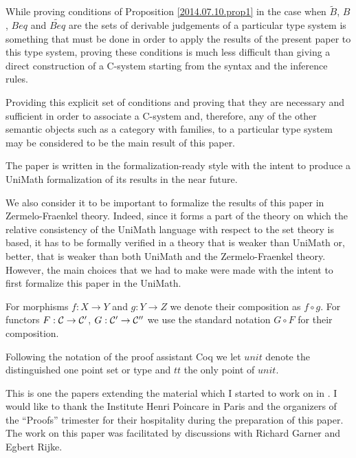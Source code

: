\documentclass[11pt]{article}
\newcommand{\sr}{\rightarrow}
\newcommand{\wt}{\widetilde}
\newcommand{\wh}{\widehat}
\begin{document}
While proving conditions of Proposition \ref{2014.07.10.prop1} in the case when ${\wt{B}}$, ${B}$, ${Beq}$ and ${\wt{Beq}}$ are the sets of derivable judgements of a particular type system is something that must be done in order to apply the results of the present paper to this type system, proving these conditions is much less difficult than giving a direct construction of a C-system starting from the syntax and the inference rules.

Providing this explicit set of conditions and proving that they are necessary and sufficient in order to associate a C-system and, therefore, any of the other semantic objects such as a category with families, to a particular type system may be considered to be the main result of this paper. 

\vspace{5mm}

The paper is written in the formalization-ready style with the intent to produce a UniMath formalization of its results in the near future. 

We also consider it to be important to formalize the results of this paper in Zermelo-Fraenkel theory. Indeed, since it forms a part of the theory on which the relative consistency of the UniMath language with respect to the set theory is based, it has to be formally verified in a theory that is weaker than UniMath or, better, that is weaker than both UniMath and the Zermelo-Fraenkel theory. However, the main choices that we had to make were made with the intent to first formalize this paper in the UniMath.

\vspace{5mm}

For morphisms $f:X\sr Y$ and $g:Y\sr Z$ we denote their composition as $f\circ g$. For functors $F:{\cal C}\sr {\cal C}'$, $G:{\cal C}'\sr {\cal C}''$ we use the standard notation $G\circ F$ for their composition. 

Following the notation of the proof assistant Coq we let $unit$ denote the distinguished one point set or type and $tt$ the only point of $unit$. 

This is one the papers extending the material which I started to work on in \cite{NTS}. I would like to thank the Institute Henri Poincare in Paris and the organizers of the ``Proofs'' trimester for their hospitality during the preparation of this paper. The work on this paper was facilitated by discussions with Richard Garner and Egbert Rijke. 

\end{document}
